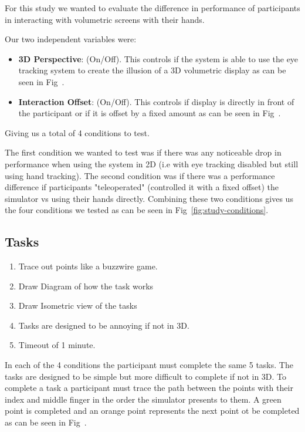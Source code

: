 For this study we wanted to evaluate the difference in performance of participants in interacting with volumetric screens with their hands. 

Our two independent variables were: 
\begin{itemize}[itemsep=-0.25em]
	\item \textbf{3D Perspective}: (On/Off). This controls if the system is able to use the eye tracking system to create the illusion of a 3D volumetric display as can be seen in Fig~\todo.
	\item \textbf{Interaction Offset}: (On/Off). This controls if display is directly in front of the participant or if it is offset by a fixed amount as can be seen in Fig~\todo.
\end{itemize}
Giving us a total of 4 conditions to test.


The first condition we wanted to test was if there was any noticeable drop in performance when using the system in 2D (i.e with eye tracking disabled but still using hand tracking). The second condition was if there was a performance difference if participants "teleoperated" (controlled it with a fixed offset) the simulator vs using their hands directly. Combining these two conditions gives us the four conditions we tested as can be seen in Fig~\ref{fig:study-conditions}. 

\subsection{Tasks}
\begin{enumerate}
	\item Trace out points like a buzzwire game. 
	\item Draw Diagram of how the task works
	\item Draw Isometric view of the tasks
	\item Tasks are designed to be annoying if not in 3D.
	\item Timeout of 1 minute.
\end{enumerate}

In each of the 4 conditions the participant must complete the same 5 tasks. The tasks are designed to be simple but more difficult to complete if not in 3D. To complete a task a participant must trace the path between the points with their index and middle finger in the order the simulator presents to them. A green point is completed and an orange point represents the next point ot be completed as can be seen in Fig~\todo. \\ 

